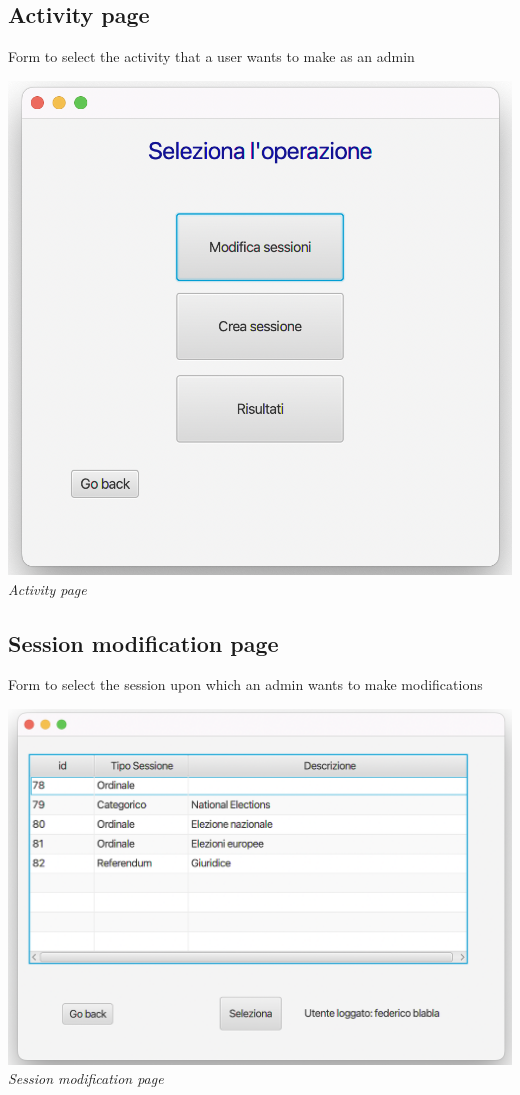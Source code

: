 \documentclass[11pt, oneside]{article}   	%
\begin{document}
\subsection{Activity page}
Form to select the activity that a user wants to make as an admin
    \begin{center}
    \includegraphics[scale=0.45]{images/ui4.png}\\
    \emph{Activity page}
    \end{center}
\subsection{Session modification page}
Form to select the session upon which an admin wants to make modifications
    \begin{center}
    \includegraphics[scale=0.5]{images/ui5.png}\\
    \emph{Session modification page}
    \end{center}
\end{document}
